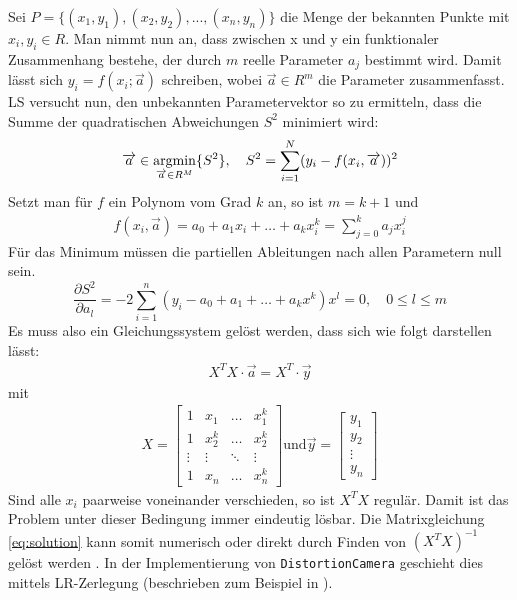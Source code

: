 Sei $P = \{(x_1, y_1), (x_2, y_2), ..., (x_n, y_n)\}$ die Menge der bekannten Punkte mit $x_i, y_i \in R$. Man nimmt nun an, dass zwischen x und y ein funktionaler Zusammenhang bestehe, der durch $m$ reelle Parameter $a_j$ bestimmt wird. Damit lässt sich $y_i = f(x_i; \overrightarrow{a})$ schreiben, wobei $\overrightarrow{a} \in R^m$ die Parameter zusammenfasst. LS versucht nun, den unbekannten Parametervektor so zu ermitteln, dass die Summe der quadratischen Abweichungen $S^2$ minimiert wird:
\begin{equation}
\begin{split}
\overrightarrow{a} \in \mathop{\mathrm{argmin}}_{\overrightarrow{a} \in R^M} \{ S^2 \}, \quad
S^2 =  \sum_{i=1}^{N} (y_i - f(x_i, \overrightarrow{a}))^2
\end{split}
\label{eq:opt}
\end{equation}
Setzt man für $f$ ein Polynom vom Grad $k$ an, so ist $m = k+1$ und
\begin{gather}
f(x_i, \overrightarrow{a}) = a_0 + a_1 x_i + \dots + a_k x_i^k = \sum_{j = 0}^{k} a_j x_i^j %
\end{gather}
Für das Minimum müssen die partiellen Ableitungen nach allen Parametern null sein.
\begin{equation}
\frac{\partial S^2}{\partial a_l} = -2 \sum_{i=1}^{n}(y_i - a_0 + a_1 + \dots + a_k x^k) x^l = 0, \quad 0 \leq l \leq m
\end{equation}
Es muss also ein Gleichungssystem gelöst werden, dass sich wie folgt darstellen lässt:
\begin{gather}
X^T X \cdot \overrightarrow{a} = X^T \cdot
\overrightarrow{y} \label{eq:solution}
\end{gather}
mit 
\begin{gather}
X =
\begin{bmatrix}
1 & x_1 & \dots & x_1^k \\
1 & x_2^k & \dots & x_2^k \\
\vdots & \vdots & \ddots & \vdots \\
1 & x_n & \dots & x_n^k
\end{bmatrix}
\text{und} \overrightarrow{y} = \begin{bmatrix}
y_1 \\ y_2 \\ \vdots \\ y_n
\end{bmatrix}
\end{gather}
Sind alle $x_i$ paarweise voneinander verschieden, so ist $X^T X$ regulär. Damit ist das Problem unter dieser Bedingung immer eindeutig lösbar. Die Matrixgleichung \ref{eq:solution} kann somit numerisch oder direkt durch Finden von $(X^T X)^{-1}$ gelöst werden \cite{lsq_poly_wolfram}. In der Implementierung von \texttt{DistortionCamera} geschieht dies mittels LR-Zerlegung (beschrieben zum Beispiel in \cite{bronstein}).

